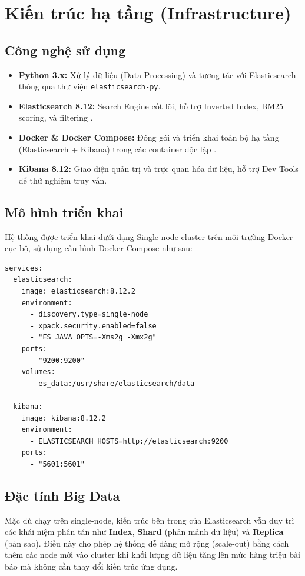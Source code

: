 \section{Kiến trúc hạ tầng (Infrastructure)}

\subsection{Công nghệ sử dụng}
\begin{itemize}
    \item \textbf{Python 3.x:} Xử lý dữ liệu (Data Processing) và tương tác với Elasticsearch thông qua thư viện \texttt{elasticsearch-py}.
    \item \textbf{Elasticsearch 8.12:} Search Engine cốt lõi, hỗ trợ Inverted Index, BM25 scoring, và filtering \cite{elasticsearch_docs}.
    \item \textbf{Docker \& Docker Compose:} Đóng gói và triển khai toàn bộ hạ tầng (Elasticsearch + Kibana) trong các container độc lập \cite{docker_docs}.
    \item \textbf{Kibana 8.12:} Giao diện quản trị và trực quan hóa dữ liệu, hỗ trợ Dev Tools để thử nghiệm truy vấn.
\end{itemize}

\subsection{Mô hình triển khai}
Hệ thống được triển khai dưới dạng Single-node cluster trên môi trường Docker cục bộ, sử dụng cấu hình Docker Compose như sau:

\begin{lstlisting}[caption={Docker Compose -- Elasticsearch \& Kibana},label={lst:docker-compose}]
services:
  elasticsearch:
    image: elasticsearch:8.12.2
    environment:
      - discovery.type=single-node
      - xpack.security.enabled=false
      - "ES_JAVA_OPTS=-Xms2g -Xmx2g"
    ports:
      - "9200:9200"
    volumes:
      - es_data:/usr/share/elasticsearch/data

  kibana:
    image: kibana:8.12.2
    environment:
      - ELASTICSEARCH_HOSTS=http://elasticsearch:9200
    ports:
      - "5601:5601"
\end{lstlisting}

\subsection{Đặc tính Big Data}
Mặc dù chạy trên single-node, kiến trúc bên trong của Elasticsearch vẫn duy trì các khái niệm phân tán như \textbf{Index}, \textbf{Shard} (phân mảnh dữ liệu) và \textbf{Replica} (bản sao). Điều này cho phép hệ thống dễ dàng mở rộng (scale-out) bằng cách thêm các node mới vào cluster khi khối lượng dữ liệu tăng lên mức hàng triệu bài báo mà không cần thay đổi kiến trúc ứng dụng.

